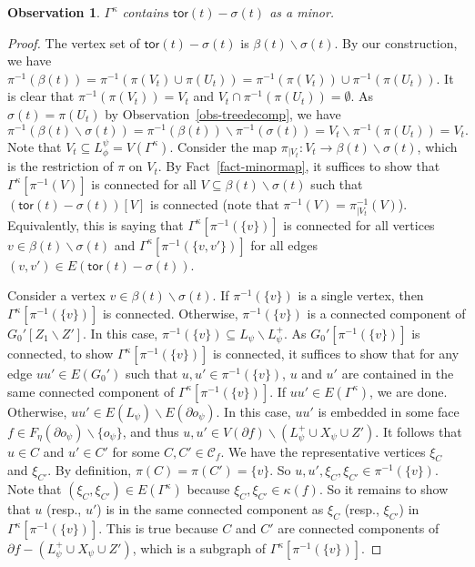 \documentclass[a4paper,11pt]{article}
\numberwithin{lemma}{section}
\newtheorem{observation}[lemma]{Observation}
\newcommand{\tor}{\mathsf{tor}}
\begin{document}
\begin{observation} \label{obs-kappaminor}
$\varGamma^\kappa$ contains $\tor(t) - \sigma(t)$ as a minor.
\end{observation}
\begin{proof}
The vertex set of $\tor(t) - \sigma(t)$ is $\beta(t) \backslash \sigma(t)$.
By our construction, we have $\pi^{-1}(\beta(t)) = \pi^{-1}(\pi(V_t) \cup \pi(U_t)) = \pi^{-1}(\pi(V_t)) \cup \pi^{-1}(\pi(U_t))$.
It is clear that $\pi^{-1}(\pi(V_t)) = V_t$ and $V_t \cap \pi^{-1}(\pi(U_t)) = \emptyset$.
As $\sigma(t) = \pi(U_t)$ by Observation~\ref{obs-treedecomp}, we have
\begin{equation*}
    \pi^{-1}(\beta(t) \backslash \sigma(t)) = \pi^{-1}(\beta(t)) \backslash \pi^{-1}(\sigma(t)) = V_t \backslash \pi^{-1}(\pi(U_t)) = V_t.
\end{equation*}
Note that $V_t \subseteq L_\phi^\psi = V(\varGamma^\kappa)$.
Consider the map $\pi_{|V_t}: V_t \rightarrow \beta(t) \backslash \sigma(t)$, which is the restriction of $\pi$ on $V_t$.
By Fact~\ref{fact-minormap}, it suffices to show that $\varGamma^\kappa[\pi^{-1}(V)]$ is connected for all $V \subseteq \beta(t) \backslash \sigma(t)$ such that $(\tor(t) - \sigma(t))[V]$ is connected (note that $\pi^{-1}(V) = \pi_{|V_t}^{-1}(V)$).
Equivalently, this is saying that $\varGamma^\kappa[\pi^{-1}(\{v\})]$ is connected for all vertices $v \in \beta(t) \backslash \sigma(t)$ and $\varGamma^\kappa[\pi^{-1}(\{v,v'\})]$ for all edges $(v,v') \in E(\tor(t) - \sigma(t))$.

Consider a vertex $v \in \beta(t) \backslash \sigma(t)$.
If $\pi^{-1}(\{v\})$ is a single vertex, then $\varGamma^\kappa[\pi^{-1}(\{v\})]$ is connected.
Otherwise, $\pi^{-1}(\{v\})$ is a connected component of $G_0'[Z_1 \backslash Z']$.
In this case, $\pi^{-1}(\{v\}) \subseteq L_{\psi} \backslash L_{\psi}^+$.
As $G_0'[\pi^{-1}(\{v\})]$ is connected, to show $\varGamma^\kappa[\pi^{-1}(\{v\})]$ is connected, it suffices to show that for any edge $uu' \in E(G_0')$ such that $u,u' \in \pi^{-1}(\{v\})$, $u$ and $u'$ are contained in the same connected component of $\varGamma^\kappa[\pi^{-1}(\{v\})]$.
If $uu' \in E(\varGamma^\kappa)$, we are done.
Otherwise, $uu' \in E(L_{\psi}) \backslash E(\partial o_{\psi})$.
In this case, $uu'$ is embedded in some face $f \in F_\eta(\partial o_{\psi}) \backslash \{o_{\psi}\}$, and thus $u,u' \in V(\partial f) \backslash (L_{\psi}^+ \cup X_{\psi} \cup Z')$.
It follows that $u \in C$ and $u' \in C'$ for some $C,C' \in \mathcal{C}_f$.
We have the representative vertices $\xi_C$ and $\xi_{C'}$.
By definition, $\pi(C) = \pi(C') = \{v\}$.
So $u,u',\xi_C,\xi_{C'} \in \pi^{-1}(\{v\})$.
Note that $(\xi_C,\xi_{C'}) \in E(\varGamma^\kappa)$ because $\xi_C,\xi_{C'} \in \kappa(f)$.
So it remains to show that $u$ (resp., $u'$) is in the same connected component as $\xi_C$ (resp., $\xi_{C'}$) in $\varGamma^\kappa[\pi^{-1}(\{v\})]$.
This is true because $C$ and $C'$ are connected components of $\partial f - (L_{\psi}^+ \cup X_{\psi} \cup Z')$, which is a subgraph of $\varGamma^\kappa[\pi^{-1}(\{v\})]$.


\end{proof}
\end{document}
